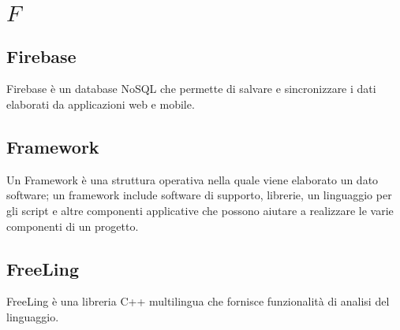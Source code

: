 \section{\quad$F\quad$}
\subsection{Firebase}
Firebase è un database NoSQL che permette di salvare e sincronizzare i dati elaborati da applicazioni web e mobile.

\subsection{Framework}
Un Framework è una struttura operativa nella quale viene elaborato un dato software; un framework include software di supporto, librerie, un linguaggio per gli script e altre componenti applicative che possono aiutare a realizzare le varie componenti di un progetto.

\subsection{FreeLing}
FreeLing è una libreria C++ multilingua che fornisce funzionalità di analisi del linguaggio.

